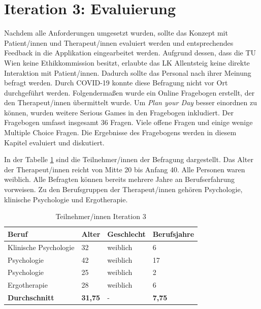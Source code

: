 \section{Iteration 3: Evaluierung}\label{sec:iteration3}
Nachdem alle Anforderungen umgesetzt wurden, sollte das Konzept mit Patient/innen und Therapeut/innen evaluiert werden und entsprechendes Feedback in die Applikation eingearbeitet werden. Aufgrund dessen, dass die TU Wien keine Ethikkommission besitzt, erlaubte das LK Allentsteig keine direkte Interaktion mit Patient/innen. Dadurch sollte das Personal nach ihrer Meinung befragt werden. Durch COVID-19 konnte diese Befragung nicht vor Ort durchgeführt werden. Folgendermaßen wurde ein Online Fragebogen erstellt, der den Therapeut/innen übermittelt wurde. Um \textit{Plan your Day} besser einordnen zu können, wurden weitere Serious Games in den Fragebogen inkludiert. Der Fragebogen umfasst insgesamt 36 Fragen. Viele offene Fragen und einige wenige Multiple Choice Fragen. Die Ergebnisse des Fragebogens werden in diesem Kapitel evaluiert und diskutiert.

In der Tabelle \ref{tab:serious-game-iteration-3} sind die Teilnehmer/innen der Befragung dargestellt. Das Alter der Therapeut/innen reicht von Mitte 20 bis Anfang 40. Alle Personen waren weiblich. Alle Befragten können bereits mehrere Jahre an Berufserfahrung vorweisen. Zu den Berufsgruppen der Therapeut/innen gehören Psychologie, klinische Psychologie und Ergotherapie.

\begin{table}[H]
    \centering
    \begin{tabular}{|l|l|l|l|} 
        \hline
        \rowcolor[rgb]{0.851,0.851,0.851} \textbf{Beruf} & \rowcolor[rgb]{0.851,0.851,0.851} \textbf{Alter} & \rowcolor[rgb]{0.851,0.851,0.851} \textbf{Geschlecht} & \rowcolor[rgb]{0.851,0.851,0.851} \textbf{Berufsjahre} \\ 
        \hline
        Klinische Psychologie & 32 & weiblich & 6 \\ 
        \hline
        Psychologie & 42 & weiblich & 17 \\ 
        \hline
        Psychologie & 25 & weiblich & 2 \\ 
        \hline
        Ergotherapie & 28 & weiblich & 6 \\ 
        \hline
        \textbf{Durchschnitt} & \textbf{31,75} & - & \textbf{7,75} \\
        \hline
    \end{tabular}
    \caption{Teilnehmer/innen Iteration 3}
	\label{tab:serious-game-iteration-3}
\end{table}

